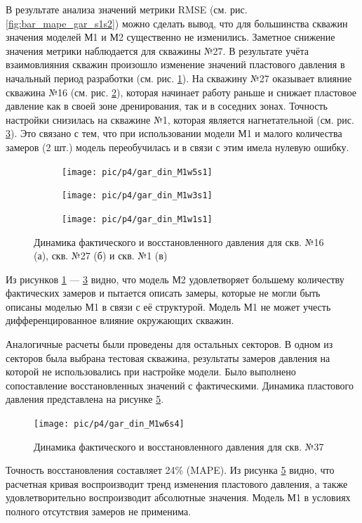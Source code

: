 \documentclass[14pt]{article}
\begin{document}
В результате анализа значений метрики RMSE (см. рис. \ref{fig:bar_mape_gar_s1s2}) можно сделать вывод, что для большинства скважин значения моделей М1 и М2 существенно не изменились. Заметное снижение значения метрики наблюдается для скважины №27.
В результате учёта взаимовлияния скважин произошло изменение значений пластового давления в начальный период разработки (см. рис. \ref{fig:din_gar_press_27M2}). На скважину №27 оказывает влияние скважина №16 (см. рис. \ref{fig:din_gar_press_16M2}), которая начинает работу раньше и снижает пластовое давление как в своей зоне дренирования, так и в соседних зонах.
Точность настройки снизилась на скважине №1, которая является нагнетательной (см. рис. \ref{fig:din_gar_press_1M2}). Это связано с тем, что при использовании модели М1 и малого количества замеров (2 шт.) модель переобучилась и в связи с этим имела нулевую ошибку. 
 \begin{figure}[!htb]
	\centering
	\begin{subfigure}[b]{0.9\linewidth}
		\texttt{[image: pic/p4/gar\_din\_M1w5s1]}
		\caption{}
		\label{fig:din_gar_press_27M2}
	\end{subfigure}
	\begin{subfigure}[b]{0.9\linewidth}
		\texttt{[image: pic/p4/gar\_din\_M1w3s1]}
		\caption{}
		\label{fig:din_gar_press_16M2}
	\end{subfigure}
	\begin{subfigure}[b]{0.9\linewidth}
		\texttt{[image: pic/p4/gar\_din\_M1w1s1]}
		\caption{}
		\label{fig:din_gar_press_1M2}
	\end{subfigure}
	\label{fig:din_gar_press_s1}
	\caption{Динамика фактического и восстановленного давления для скв. №16 (а), скв. №27 (б) и скв. №1 (в)}
\end{figure}
Из рисунков \ref{fig:din_gar_press_27M2} --- \ref{fig:din_gar_press_1M2} видно, что модель М2 удовлетворяет большему количеству фактических замеров и пытается описать замеры, которые не могли быть описаны моделью М1 в связи с её структурой. Модель М1 не может учесть дифференцированное влияние окружающих скважин.

Аналогичные расчеты были проведены для остальных секторов. В одном из секторов была выбрана тестовая скважина, результаты замеров давления на которой не использовались при настройке модели. Было выполнено сопоставление восстановленных значений с фактическими. Динамика пластового давления представлена на рисунке \ref{fig:gar_din_M1w6s4}.
\begin{figure}[!htb]
	\centering
	\texttt{[image: pic/p4/gar\_din\_M1w6s4]}
	\caption{Динамика фактического и восстановленного давления для скв. №37}
	\label{fig:gar_din_M1w6s4}
\end{figure}
Точность восстановления составляет 24\% (MAPE). Из рисунка \ref{fig:gar_din_M1w6s4} видно, что расчетная кривая воспроизводит тренд изменения пластового давления, а также удовлетворительно воспроизводит абсолютные значения. Модель М1 в условиях полного отсутствия замеров не применима.  
 
\end{document}
